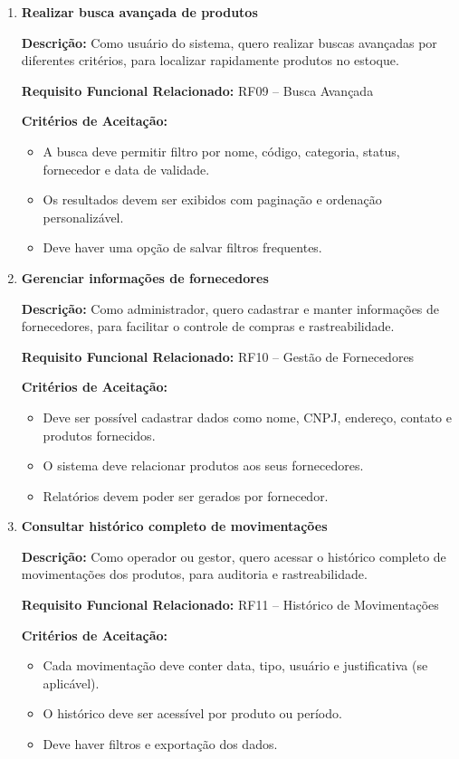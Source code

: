 \documentclass[
	12pt,				%
	openright,			%
	twoside,			%
	a4paper,			%
	english,			%
	french,				%
	spanish,			%
	brazil				%
	]{abntex2}
\begin{document}
\begin{enumerate}
\item \textbf{Realizar busca avançada de produtos}

\textbf{Descrição:} Como usuário do sistema, quero realizar buscas avançadas por diferentes critérios, para localizar rapidamente produtos no estoque.

\textbf{Requisito Funcional Relacionado:} RF09 -- Busca Avançada

\textbf{Critérios de Aceitação:}
\begin{itemize}
  \item A busca deve permitir filtro por nome, código, categoria, status, fornecedor e data de validade.
  \item Os resultados devem ser exibidos com paginação e ordenação personalizável.
  \item Deve haver uma opção de salvar filtros frequentes.
\end{itemize}

\item \textbf{Gerenciar informações de fornecedores}

\textbf{Descrição:} Como administrador, quero cadastrar e manter informações de fornecedores, para facilitar o controle de compras e rastreabilidade.

\textbf{Requisito Funcional Relacionado:} RF10 -- Gestão de Fornecedores

\textbf{Critérios de Aceitação:}
\begin{itemize}
  \item Deve ser possível cadastrar dados como nome, CNPJ, endereço, contato e produtos fornecidos.
  \item O sistema deve relacionar produtos aos seus fornecedores.
  \item Relatórios devem poder ser gerados por fornecedor.
\end{itemize}

\item \textbf{Consultar histórico completo de movimentações}

\textbf{Descrição:} Como operador ou gestor, quero acessar o histórico completo de movimentações dos produtos, para auditoria e rastreabilidade.

\textbf{Requisito Funcional Relacionado:} RF11 -- Histórico de Movimentações

\textbf{Critérios de Aceitação:}
\begin{itemize}
  \item Cada movimentação deve conter data, tipo, usuário e justificativa (se aplicável).
  \item O histórico deve ser acessível por produto ou período.
  \item Deve haver filtros e exportação dos dados.
\end{itemize}

\end{enumerate}
\end{document}
